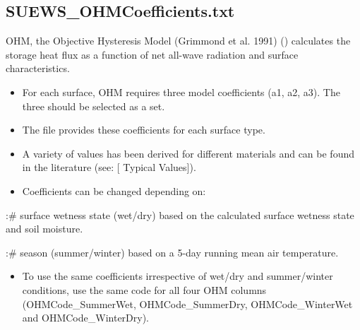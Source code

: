\documentclass[letterpaper,10pt,english]{sphinxmanual}
\begin{document}
\subsection{SUEWS\_OHMCoefficients.txt}
\label{\detokenize{input_files/SUEWS_SiteInfo/SUEWS_OHMCoefficients::doc}}\label{\detokenize{input_files/SUEWS_SiteInfo/SUEWS_OHMCoefficients:suews-ohmcoefficients-txt}}
OHM, the Objective Hysteresis Model (Grimmond et al. 1991) \label{\detokenize{input_files/SUEWS_SiteInfo/SUEWS_OHMCoefficients:id1}}{\hyperref[\detokenize{references:g91ohm}]{\sphinxcrossref{{[}G91OHM{]}}}} ()
calculates the storage heat flux as a function of net all-wave radiation
and surface characteristics.
\begin{itemize}
\item {} 
For each surface, OHM requires three model coefficients (a1, a2, a3).
The three should be selected as a set.

\item {} 
The  file provides these coefficients
for each surface type.

\item {} 
A variety of values has been derived for different materials and can
be found in the literature (see:
{[}\textbar{}
Typical Values{]}).

\item {} 
Coefficients can be changed depending on:

\end{itemize}

:\# surface wetness state (wet/dry) based on the calculated surface
wetness state and soil moisture.

:\# season (summer/winter) based on a 5-day running mean air temperature.
\begin{itemize}
\item {} 
To use the same coefficients irrespective of wet/dry and
summer/winter conditions, use the same code for all four OHM columns
(OHMCode\_SummerWet, OHMCode\_SummerDry, OHMCode\_WinterWet and
OHMCode\_WinterDry).

\end{itemize}
\end{document}
